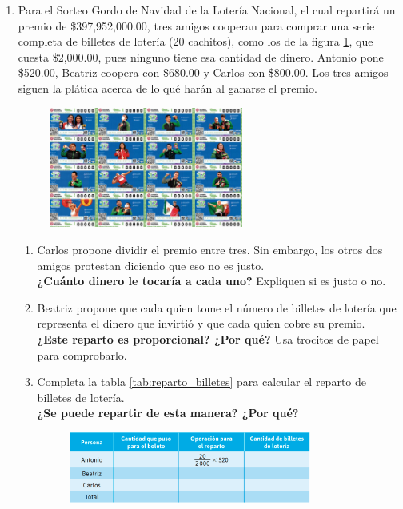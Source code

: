 \documentclass[11pt]{book}
\begin{document}
\begin{enumerate}
  \item Para el Sorteo Gordo de Navidad de la Lotería Nacional, el cual repartirá un premio de \$397,952,000.00, tres amigos
        cooperan para comprar una serie completa de billetes de lotería (20 cachitos), como los de la figura \ref{fig:cachito}, que cuesta
        \$2,000.00, pues ninguno tiene esa cantidad de dinero. Antonio pone \$520.00, Beatriz coopera con \$680.00 y Carlos
        con \$800.00. Los tres amigos siguen la plática acerca de lo qué harán al ganarse el premio.
        \begin{figure}[H]
          \centering
          \includegraphics[width=0.6\textwidth]{cachito}
          \label{fig:cachito}
        \end{figure}
        \begin{enumerate}
          \item Carlos propone dividir el premio entre tres. Sin embargo, los otros dos amigos protestan diciendo que eso no es justo. \\
                \textbf{¿Cuánto dinero le tocaría a cada uno?} Expliquen si es justo o no.\\[0.5cm]
          \item Beatriz propone que cada quien tome el número de billetes de lotería que representa el dinero que invirtió y que cada quien cobre su premio. \\
                \textbf{¿Este reparto es proporcional? ¿Por qué?} Usa trocitos de papel para comprobarlo.\\[0.5cm]
          \item Completa la tabla \ref{tab:reparto_billetes} para calcular el reparto de billetes de lotería.\\
                \textbf{¿Se puede repartir de esta manera? ¿Por qué?}\\[0.5cm]
                \begin{figure}[H]
                  \centering
                  \includegraphics[width=0.8\textwidth]{tabla2.17.png}

\end{figure}
\end{enumerate}
\end{enumerate}
\end{document}
